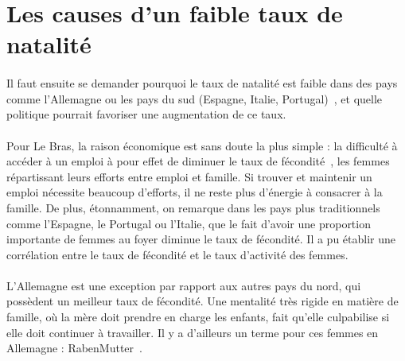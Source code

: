 \section{Les causes d'un faible taux de natalité}
\paragraph{}Il faut ensuite se demander pourquoi le taux de natalité est faible dans des pays comme l’Allemagne ou les pays du sud (Espagne, Italie, Portugal)~\citep{4model}, et quelle politique pourrait favoriser une augmentation de ce taux. 

\paragraph{}Pour Le Bras, la raison économique est sans doute la plus simple : la difficulté à accéder à un emploi à pour effet de diminuer le taux de fécondité~\citep[pp.25]{heran}, les femmes répartissant leurs efforts entre emploi et famille. Si trouver et maintenir un emploi nécessite beaucoup d’efforts, il ne reste plus d’énergie à consacrer à la famille. De plus, étonnamment, on remarque dans les pays plus traditionnels comme l’Espagne, le Portugal ou l’Italie, que le fait d’avoir une proportion importante de femmes au foyer diminue le taux de fécondité. Il a pu établir une corrélation entre le taux de fécondité et le taux d'activité des femmes. 

\paragraph{}L’Allemagne est une exception par rapport aux autres pays du nord, qui possèdent un meilleur taux de fécondité. Une mentalité très rigide en matière de famille, où la mère doit prendre en charge les enfants, fait qu'elle culpabilise si elle doit continuer à travailler. Il y a d’ailleurs un terme pour ces femmes en Allemagne : RabenMutter~\citep{mutter}. 

